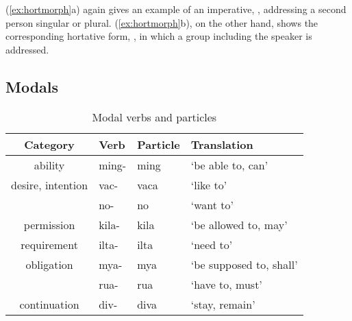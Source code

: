(\ref{ex:hortmorph}a) again gives an example of an imperative,
, addressing a second person singular or plural.
(\ref{ex:hortmorph}b), on the other hand, shows the corresponding hortative
form, , in which a group including the speaker is
addressed.



\subsection{Modals}
\label{subsec:modals}

\begin{table}
\caption{Modal verbs and particles}
\begin{tabu} to \linewidth {C[3] I[2] I[2] X[4]}
\tableheaderfont\toprule
Category
	& Verb
	& Particle
	& Translation
	\\
\toprule

ability
	& ming- %
	& ming %
	& `be able to, can'
	\\
	
\midrule
	
desire, intention
	& vac- %
	& vaca %
	& `like to'
	\\
	
	& no- %
	& no %
	& `want to'
	\\
	
\midrule

permission
	& kila- %
	& kila %
	& `be allowed to, may'
	\\
	
\midrule

requirement
	& ilta- %
	& ilta %
	& `need to'
	\\
	
\midrule

obligation
	& mya- %
	& mya %
	& `be supposed to, shall'
	\\
	
	& rua- %
	& rua %
	& `have to, must'
	\\
	
\midrule
	
continuation
	& div- %
	& diva %
	& `stay, remain'
	\\

\bottomrule
\end{tabu}
\label{tab:modverb}
\end{table}

